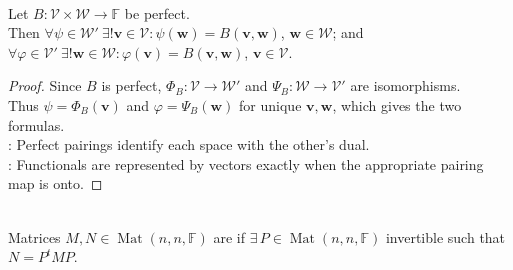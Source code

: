 \begin{corollary} \label{cor:perfect-pairing-represents-functionals} \\
Let $B:\mathcal{V}\times\mathcal{W}\to\mathbb{F}$ be perfect.\\
Then $\forall\psi\in\mathcal{W}'\ \exists!\mathbf{v}\in\mathcal{V}: \psi(\mathbf{w})=B(\mathbf{v},\mathbf{w})$, $\mathbf{w}\in\mathcal{W}$; and $\forall\varphi\in\mathcal{V}'\ \exists!\mathbf{w}\in\mathcal{W}: \varphi(\mathbf{v})=B(\mathbf{v},\mathbf{w})$, $\mathbf{v}\in\mathcal{V}$.
\begin{proof}
Since $B$ is perfect, $\Phi_B:\mathcal{V}\to\mathcal{W}'$ and $\Psi_B:\mathcal{W}\to\mathcal{V}'$ are isomorphisms.\\
Thus $\psi=\Phi_B(\mathbf{v})$ and $\varphi=\Psi_B(\mathbf{w})$ for unique $\mathbf{v},\mathbf{w}$, which gives the two formulas.\\
: Perfect pairings identify each space with the other's dual.\\
: Functionals are represented by vectors exactly when the appropriate pairing map is onto.
\end{proof}
\end{corollary}

\begin{definition} \label{def:matrix-congruence} \\
Matrices $M,N\in\operatorname{Mat}(n,n,\mathbb{F})$ are  if $\exists\,P\in\operatorname{Mat}(n,n,\mathbb{F})$ invertible such that $N=P^tMP$.
\end{definition}

